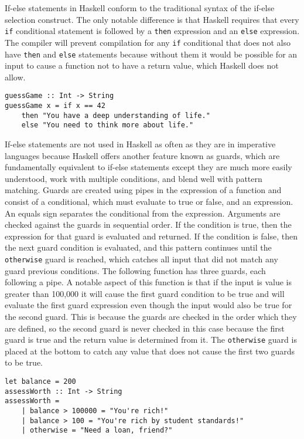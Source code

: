 \documentclass[titlepage,12pt]{article}
\begin{document}
If-else statements in Haskell conform to the traditional syntax of the if-else selection construct. The only notable 
difference is that Haskell requires that every \texttt{if} conditional statement is followed by a \texttt{then} expression and an \texttt{else} expression. 
The compiler will prevent compilation for any \texttt{if} conditional that does not also have \texttt{then} and \texttt{else} statements because 
without them it would be possible for an input to cause a function not to have a return value, which Haskell does not allow.

\begin{verbatim}
guessGame :: Int -> String
guessGame x = if x == 42
    then "You have a deep understanding of life."
    else "You need to think more about life."
\end{verbatim}

If-else statements are not used in Haskell as often as they are in imperative languages because Haskell offers another feature 
known as guards, which are fundamentally equivalent to if-else statements except they are much more easily understood, 
work with multiple conditions, and blend well with pattern matching. Guards are created using pipes in the 
expression of a function and consist of a conditional, which must evaluate to true or false, and an expression. 
An equals sign separates the conditional from the expression. Arguments are checked against the guards in 
sequential order. If the condition is true, then the expression for that guard is evaluated and returned. 
If the condition is false, then the next guard condition is evaluated, and this pattern continues until the 
\texttt{otherwise} guard is reached, which catches all input that did not match any guard previous conditions. The 
following function has three guards, each following a pipe. A notable aspect of this function is that if the 
input is value is greater than 100,000 it will cause the first guard condition to be true and will evaluate the 
first guard expression even though the input would also be true for the second guard. This is because the guards are 
checked in the order which they are defined, so the second guard is never checked in this case because the first guard is true and 
the return value is  determined from it. The \texttt{otherwise} guard is placed at the bottom to catch any value that does not 
cause the first two guards to be true. 

\newpage
\begin{verbatim}
let balance = 200
assessWorth :: Int -> String
assessWorth =
    | balance > 100000 = "You're rich!"
    | balance > 100 = "You're rich by student standards!"
    | otherwise = "Need a loan, friend?"
\end{verbatim}
\end{document}

